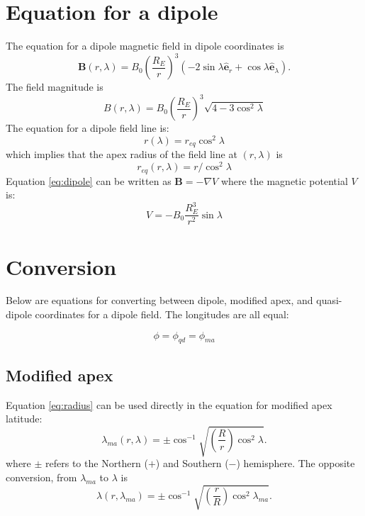 \documentclass[11pt]{article}
\begin{document}
\section{Equation for a dipole}
The equation for a dipole magnetic field in dipole coordinates is
\begin{equation}
\mathbf B (r, \lambda) = B_0\left(\frac{R_E}{r}\right)^3(-2\sin \lambda \hat{\mathbf e}_r + \cos \lambda \hat{ \mathbf e}_\lambda). \label{eq:dipole}
\end{equation}
The field magnitude is
\begin{equation}
B (r, \lambda) = B_0\left(\frac{R_E}{r}\right)^3\sqrt{4 - 3\cos^2\lambda} \label{eq:dipolestrength}
\end{equation}
The equation for a dipole field line is:
\begin{equation}
r(\lambda) = r_{eq}\cos^2\lambda
\end{equation}
which implies that the apex radius of the field line at $(r, \lambda)$ is
\begin{equation}
r_{eq}(r, \lambda) = r/\cos^2\lambda \label{eq:radius}
\end{equation}
Equation \ref{eq:dipole} can be written as $\mathbf{B} = -\nabla V$ where the magnetic potential $V$ is:
\begin{equation}
V = -B_0 \frac{R_E^3}{r^2}\sin\lambda \label{eq:dipole_potential}
\end{equation}


\section{Conversion}
Below are equations for converting between dipole, modified apex, and quasi-dipole coordinates for a dipole field. The longitudes are all equal:

\begin{equation}
\boxed{\phi = \phi_{qd} = \phi_{ma}}
\end{equation}

\subsection{Modified apex}
Equation \ref{eq:radius} can be used directly in the equation for modified apex latitude:
\begin{equation}
\boxed{\lambda_{ma}(r, \lambda) = \pm \cos^{-1}\sqrt{\left(\frac{R}{r}\right)\cos^2\lambda}.}\label{eq:apexlat}
\end{equation}
where $\pm$ refers to the Northern ($+$) and Southern ($-$) hemisphere. The opposite conversion, from $\lambda_{ma}$ to $\lambda$ is
\begin{equation}
\boxed{\lambda(r, \lambda_{ma}) = \pm\cos^{-1}\sqrt{\left(\frac{r}{R}\right)\cos^2\lambda_{ma}}.} \label{eq:apex_lat_to_dipole_lat}
\end{equation}
\end{document}
